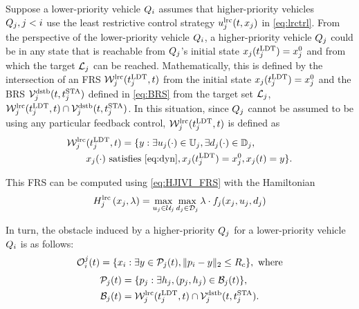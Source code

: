 Suppose a lower-priority vehicle $Q_i$ assumes that higher-priority vehicles $Q_j, j < i$ use the least restrictive control strategy $u_j^\text{lrc}(t, x_j)$ in \eqref{eq:lrctrl}. From the perspective of the lower-priority vehicle $Q_i$, a higher-priority vehicle $Q_j$ could be in any state that is reachable from $Q_j$'s initial state $x_j(t^\text{LDT}_j) = x_{j}^0$ and from which the target $\mathcal{L}_j$ can be reached. Mathematically, this is defined by the intersection of an FRS $\mathcal{W}_j^\text{lrc}(t^\text{LDT}_j, t)$ from the initial state $x_j(t^\text{LDT}_j)=x_{j}^0$ and the BRS $\mathcal{V}_j^\text{dstb}(t, t^\text{STA}_j)$ defined in \eqref{eq:BRS} from the target set $\mathcal{L}_j$, $\mathcal{W}_j^\text{lrc}(t^\text{LDT}_j, t) \cap \mathcal{V}_j^\text{dstb}(t, t^\text{STA}_j)$. In this situation, since $Q_j$ cannot be assumed to be using any particular feedback control, $\mathcal{W}_j^\text{lrc}(t^\text{LDT}_j, t)$ is defined as
\vspace{-0.1cm}
\begin{equation}
\label{eq:FRS2}
\begin{aligned}
&\frs_j^\text{lrc}(\ldt_j, t) = \{y: \exists \ctrl_j(\cdot)\in\cfset_j, \exists \dstb_j(\cdot) \in \dfset_j, \\
& \qquad\state_j(\cdot) \text{ satisfies \eqref{eq:dyn}}, \state_j(\ldt_j) = \state_{j}^0, \state_j(t) = y\}.
\end{aligned}
\vspace{-0.1cm}
\end{equation}

This FRS can be computed using \eqref{eq:HJIVI_FRS} with the Hamiltonian
\vspace{-0.1cm}
\begin{equation}
H_j^\text{lrc}\left(x_j, \lambda\right) = \max_{u_j \in \mathcal{U}_j} \max_{d_j \in \mathcal{D}_j} \lambda \cdot f_j(x_j, u_j, d_j)
\end{equation}

In turn, the obstacle induced by a higher-priority $Q_j$ for a lower-priority vehicle $Q_i$ is as follows:
\vspace{-0.1cm}
\begin{equation}
\label{eqn:lrcObs1}
\ioset_i^j(t) = \{\state_i: \exists y \in \pfrs_j(t), \|\pos_i - y\|_2 \le \rc \}, \text{ where}
\end{equation}
\vspace{-0.1cm}
\begin{align}
\pfrs_j(t) & = \{p_j: \exists \npos_j, (p_j, \npos_j) \in \boset_j(t) \}, \label{eqn:lrcObs2}\\
\boset_j(t) & = \frs_j^\text{lrc}(\ldt_j, t) \cap \brs_j^\text{dstb}(t, \sta_j). \label{eqn:lrcObs3}
\end{align}

